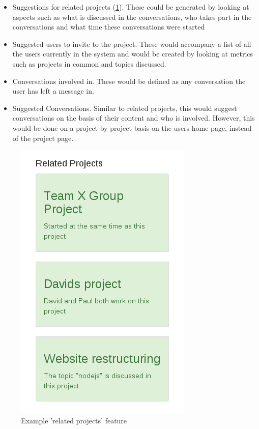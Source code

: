 \documentclass{l4proj}
\begin{document}
\begin{itemize}
\item Suggestions for related projects (\ref{fig:5}).  These could be generated by looking at aspects such as what is discussed in the conversations, who takes part in the conversations and what time these conversations were started
\item Suggested users to invite to the project.  These would accompany a list of all the users currently in the system and would be created by looking at metrics such as projects in common and topics discussed.
\item Conversations involved in.  These would be defined as any conversation the user has left a message in.
\item Suggested Conversations.  Similar to related projects, this would suggest conversations on the basis of their content and who is involved.  However, this would be done on a project by project basis on the users home page, instead of the project page.
\end{itemize}

\begin{figure}[h]
\includegraphics{RelatedProj.png}
\centering
\caption{Example 'related projects' feature}
\label{fig:5}
\end{figure}
\end{document}

